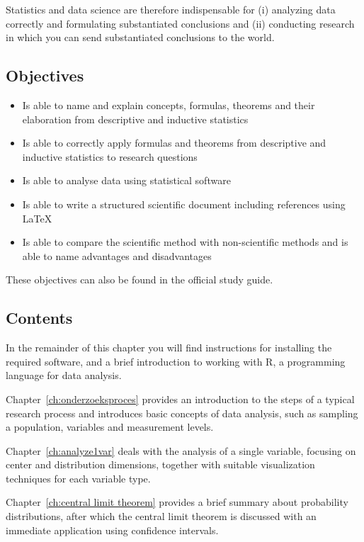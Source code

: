 Statistics and data science are therefore indispensable for (i) analyzing data correctly and formulating substantiated conclusions and (ii) conducting research in which you can send substantiated conclusions to the world.

\subsection{Objectives}

\begin{itemize}
    \item Is able to name and explain concepts, formulas, theorems  and their elaboration from descriptive and inductive statistics
    \item Is able to correctly apply formulas and theorems from descriptive and inductive statistics to research questions
    \item Is able to analyse data using statistical software
    \item Is able to write a structured scientific document including references using \LaTeX{}
    \item Is able to compare the scientific method with non-scientific methods and is able to name advantages and disadvantages
\end{itemize}

These objectives can also be found in the official study guide.

\subsection{Contents}

In the remainder of this chapter you will find instructions for installing the required software, and a brief introduction to working with R, a programming language for data analysis.

Chapter~\ref{ch:onderzoeksproces} provides an introduction to the steps of a typical research process and introduces basic concepts of data analysis, such as sampling a population, variables and measurement levels.

Chapter~\ref{ch:analyze1var} deals with the analysis of a single variable, focusing on center and distribution dimensions, together with suitable visualization techniques for each variable type.

Chapter~\ref {ch:central limit theorem} provides a brief summary about probability distributions, after which the central limit theorem is discussed with an immediate application using confidence intervals.

